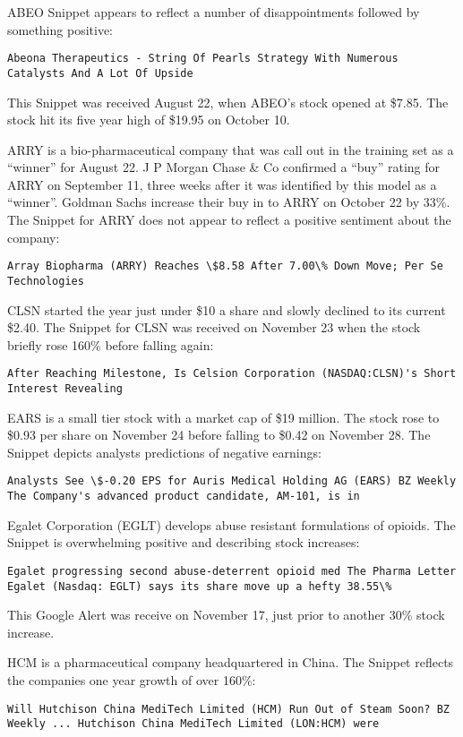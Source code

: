 \documentclass[sigconf]{acmart}
\begin{document}
ABEO Snippet appears to reflect a number of disappointments followed by something positive:
\begin{lstlisting}
Abeona Therapeutics - String Of Pearls Strategy With Numerous Catalysts And A Lot Of Upside
\end{lstlisting}
This Snippet was received August 22, when ABEO's stock opened at \$7.85. The stock hit its five year high of \$19.95 on October 10. 

ARRY is a bio-pharmaceutical company that was call out in the training set as a ``winner'' for August 22. J P Morgan Chase \& Co confirmed a ``buy'' rating for ARRY on September 11, three weeks after it was identified by this model as a ``winner''. Goldman Sachs increase their buy in to ARRY  on October 22 by 33\%. The Snippet for ARRY does not appear to reflect a positive sentiment about the company:
\begin{lstlisting}
Array Biopharma (ARRY) Reaches \$8.58 After 7.00\% Down Move; Per Se Technologies
\end{lstlisting}

CLSN started the year just under \$10 a share and slowly declined to its current \$2.40. The Snippet for CLSN was received on November 23 when the stock briefly rose 160\% before falling again:
\begin{lstlisting}
After Reaching Milestone, Is Celsion Corporation (NASDAQ:CLSN)'s Short Interest Revealing
\end{lstlisting}

EARS is a small tier stock with a market cap of \$19 million. The stock rose to \$0.93 per share on November 24 before falling to \$0.42 on November 28. The Snippet depicts analysts predictions of negative earnings:
\begin{lstlisting}
Analysts See \$-0.20 EPS for Auris Medical Holding AG (EARS) BZ Weekly The Company's advanced product candidate, AM-101, is in
\end{lstlisting}

Egalet Corporation (EGLT) develops abuse resistant formulations of opioids. The Snippet is overwhelming positive and describing stock increases:
\begin{lstlisting}
Egalet progressing second abuse-deterrent opioid med The Pharma Letter Egalet (Nasdaq: EGLT) says its share move up a hefty 38.55\%
\end{lstlisting}
This Google Alert was receive on November 17, just prior to another 30\% stock increase.

HCM is a pharmaceutical company headquartered in China. The Snippet reflects the companies one year growth of over 160\%:
\begin{lstlisting}
Will Hutchison China MediTech Limited (HCM) Run Out of Steam Soon? BZ Weekly ... Hutchison China MediTech Limited (LON:HCM) were
\end{lstlisting}
\end{document}
